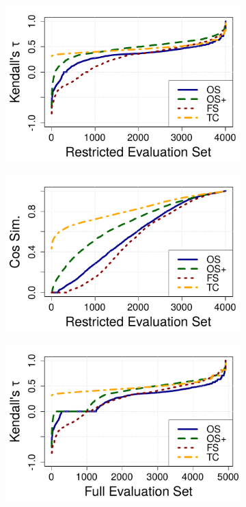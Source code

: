 \begin{figure}[t!]
\begin{subfigure}{.5\textwidth}
\centering
\includegraphics[width=\linewidth]{img/kendall_tau_restricted.pdf}
\end{subfigure}%
\begin{subfigure}{.5\textwidth}
\includegraphics[width=\linewidth]{img/cos_sim_restricted.pdf}
\end{subfigure}
\begin{subfigure}{.5\textwidth}
\centering
\includegraphics[width=\linewidth]{img/kendall_tau_full.pdf}

\end{subfigure}
\end{figure}
